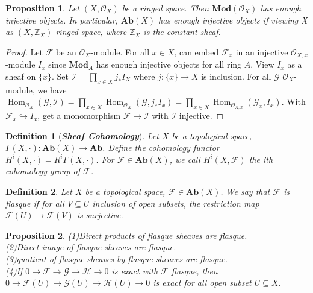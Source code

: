 \documentclass{ctexart}
\newtheorem{definition}{Definition}[section]
\newtheorem{proposition}{Proposition}[section]
\renewcommand{\hom}{\operatorname{Hom}}
\newcommand{\abeliangroups}{\mathbf{Ab}}
\newcommand{\module}{\mathbf{Mod}}
\begin{document}
\begin{proposition}
    Let $(X, \mathcal{O}_{X})$ be a ringed space.
    Then $\module (\mathcal{O}_{X})$ has enough injective objects.
    In particular, $\abeliangroups (X)$ has enough injective objects if viewing X as $(X, \mathbb{Z}_{X})$ ringed space, where $\mathbb{Z}_{X}$ is the constant sheaf.
    \label{Proposition 2.2}
\end{proposition}
\begin{proof}
    Let $\mathcal{F}$ be an $\mathcal{O}_{X}$-module.
    For all $x\in X$, can embed $\mathcal{F}_{x}$ in an injective $\mathcal{O}_{X, x}$-module $I_{x}$ since $\module_{A}$ has enough injective objects for all ring $A$.
    View $I_{x}$ as a sheaf on $\{x\}$.
    Set $\mathcal{I} = \prod_{x\in X} j_{\ast}I_{X}$ where $j: \{x\} \longrightarrow X$ is inclusion.
    For all $\mathcal{G}$ $\mathcal{O}_{X}$-module, we have $\hom_{\mathcal{O}_{X}}(\mathcal{G}, \mathcal{I}) = \prod_{x\in X} \hom_{\mathcal{O}_{X}}(\mathcal{G}, j_{\ast}I_{x}) = \prod_{x\in X} \hom_{\mathcal{O}_{X, x}}(\mathcal{G}_{x}, I_{x})$.
    With $\mathcal{F}_{x} \hookrightarrow I_{x}$, get a monomorphism $\mathcal{F} \longrightarrow \mathcal{I}$ with $\mathcal{I}$ injective.
\end{proof}
\begin{definition}[\textbf{\emph{Sheaf Cohomology}}]
    Let $X$ be a topological space, $\Gamma(X, \cdot): \abeliangroups (X) \longrightarrow \abeliangroups$.
    Define the cohomology functor $H^{i}(X, \cdot) = R^{i}\Gamma(X, \cdot)$.
    For $\mathcal{F}\in \abeliangroups (X)$, we call $H^{i}(X, \mathcal{F})$ the ith cohomology group of $\mathcal{F}$.
\end{definition}
\begin{definition}
    Let $X$ be a topological space, $\mathcal{F}\in \abeliangroups (X)$.
    We say that $\mathcal{F}$ is flasque if for all $V \subseteq U$ inclusion of open subsets,
    the restriction map $\mathcal{F}(U) \longrightarrow \mathcal{F}(V)$ is surjective.
\end{definition}
\begin{proposition}
    (1)Direct products of flasque sheaves are flasque. \\
    (2)Direct image of flasque sheaves are flasque. \\
    (3)quotient of flasque sheaves by flasque sheaves are flasque. \\
    (4)If $0 \longrightarrow \mathcal{F} \longrightarrow \mathcal{G} \longrightarrow \mathcal{H} \longrightarrow 0$ is exact with $\mathcal{F}$ flasque,
    then $0 \longrightarrow \mathcal{F}(U) \longrightarrow \mathcal{G}(U) \longrightarrow \mathcal{H}(U) \longrightarrow 0$ is exact for all open subset $U \subseteq X$.
    \label{Proposition 2.3}
\end{proposition}
\end{document}
